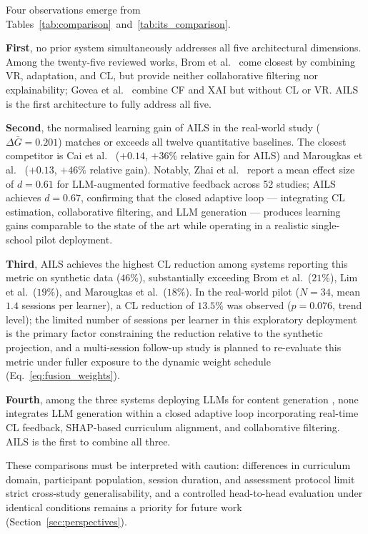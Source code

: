 \documentclass[ASNA,twocolumn]{USG} %
\begin{document}
Four observations emerge from
Tables~\ref{tab:comparison}~and~\ref{tab:its_comparison}.

\textbf{First}, no prior system simultaneously addresses all
five architectural dimensions.
Among the twenty-five reviewed works, Brom et al.\
\cite{Brom2020} come closest by combining VR, adaptation,
and CL, but provide neither collaborative filtering nor
explainability; Govea et al.\ \cite{Govea2024} combine CF
and XAI but without CL or VR.
AILS is the first architecture to fully address all five.

\textbf{Second}, the normalised learning gain of AILS in
the real-world study ($\Delta\bar{G}{=}0.201$) matches or
exceeds all twelve quantitative baselines.
The closest competitor is Cai et al.\ \cite{Cai2022}
($+0.14$, $+36\%$ relative gain for AILS) and Marougkas
et al.\ \cite{Marougkas2024} ($+0.13$, $+46\%$ relative
gain).
Notably, Zhai et al.\ \cite{Zhai2024} report a mean
effect size of $d{=}0.61$ for LLM-augmented formative
feedback across 52 studies; AILS achieves $d{=}0.67$,
confirming that the closed adaptive loop --- integrating
CL estimation, collaborative filtering, and LLM generation
--- produces learning gains comparable to the state of the
art while operating in a realistic single-school pilot
deployment.

\textbf{Third}, AILS achieves the highest CL reduction
among systems reporting this metric on synthetic data ($46\%$),
substantially exceeding Brom et al.\ ($21\%$), Lim et al.\
($19\%$), and Marougkas et al.\ ($18\%$).
In the real-world pilot ($N{=}34$, mean $1.4$ sessions per
learner), a CL reduction of $13.5\%$ was observed
($p{=}0.076$, trend level); the limited number of sessions
per learner in this exploratory deployment is the primary
factor constraining the reduction relative to the synthetic
projection, and a multi-session follow-up study is planned
to re-evaluate this metric under fuller exposure to the
dynamic weight schedule (Eq.~\eqref{eq:fusion_weights}).

\textbf{Fourth}, among the three systems deploying LLMs
for content generation \cite{Tack2022,Darvishi2024,
Macina2023}, none integrates LLM generation within a
closed adaptive loop incorporating real-time CL feedback,
SHAP-based curriculum alignment, and collaborative
filtering.
AILS is the first to combine all three.

These comparisons must be interpreted with caution:
differences in curriculum domain, participant population,
session duration, and assessment protocol limit strict
cross-study generalisability, and a controlled head-to-head
evaluation under identical conditions remains a priority
for future work (Section~\ref{sec:perspectives}).
\end{document}
